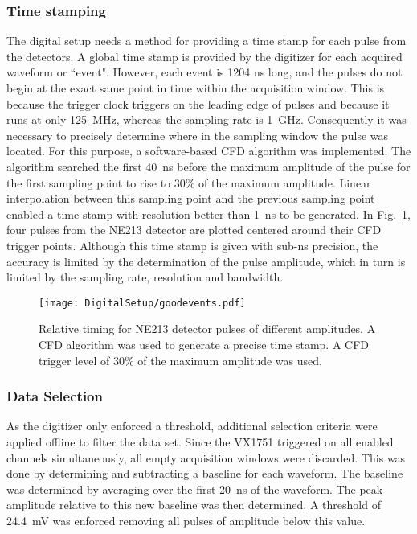 \documentclass[main.tex]{subfiles}
\begin{document}
\subsubsection{Time stamping}
The digital setup needs a method for providing a time stamp for each pulse from the detectors. A global time stamp is provided by the digitizer for each acquired waveform or ``event". However, each event is 1204 ns long, and the pulses do not begin at the exact same point in time within the acquisition window. This is because the trigger clock triggers on the leading edge of pulses and because it runs at only \SI{125}{MHz}, whereas the sampling rate is \SI{1}{GHz}. Consequently it was necessary to precisely determine where in the sampling window the pulse was located. For this purpose, a software-based CFD algorithm was implemented. The algorithm searched the first \SI{40}{ns} before the maximum amplitude of the pulse for the first sampling point to rise to 30\% of the maximum amplitude. Linear interpolation between this sampling point and the previous sampling point enabled a time stamp with resolution better than \SI{1}{ns} to be generated. In Fig.~\ref{fig:cfd_trig}, four pulses from the NE213 detector are plotted centered around their CFD trigger points. Although this time stamp is given with sub-ns precision, the accuracy is limited by the determination of the pulse amplitude, which in turn is limited by the sampling rate, resolution and bandwidth. 

\begin{figure}[hb!]
    \centering
        \texttt{[image: DigitalSetup/goodevents.pdf]}
        \caption[Relative timing for NE213 detector pulses of different amplitudes]{Relative timing for NE213 detector pulses of different amplitudes. A CFD algorithm was used to generate a precise time stamp. A CFD trigger level of 30\% of the maximum amplitude was used.}
    \label{fig:cfd_trig} 
\end{figure}

\subsubsection{Data Selection}
As the digitizer only enforced a threshold, additional selection criteria were applied offline to filter the data set. Since the VX1751 triggered on all enabled channels simultaneously, all empty acquisition windows were discarded. This was done by determining and subtracting a baseline for each waveform. The baseline was determined by averaging over the first \SI{20}{ns} of the waveform. The peak amplitude relative to this new baseline was then determined. A threshold of \SI{24.4}{mV} was enforced removing all pulses of amplitude below this value.
\end{document}
